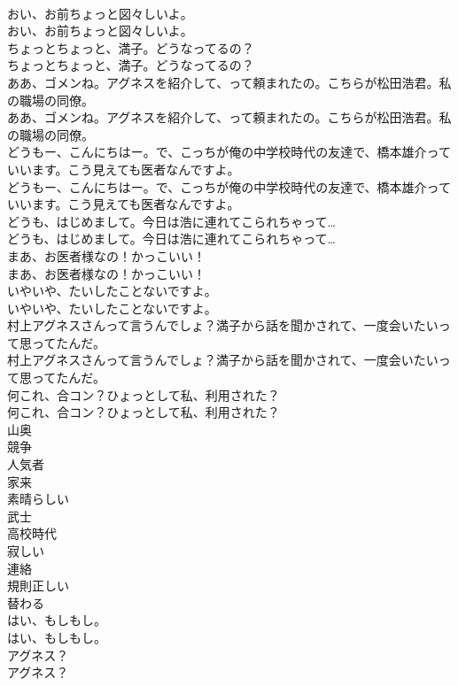 \documentclass[8pt]{extreport}
\begin{document}
\begin{CJK}{UTF8}{min}
\\	おい、お前ちょっと図々しいよ。	
\\	おい、お前ちょっと図々しいよ。 
\\	ちょっとちょっと、満子。どうなってるの？	
\\	ちょっとちょっと、満子。どうなってるの？ 
\\	ああ、ゴメンね。アグネスを紹介して、って頼まれたの。こちらが松田浩君。私の職場の同僚。	
\\	ああ、ゴメンね。アグネスを紹介して、って頼まれたの。こちらが松田浩君。私の職場の同僚。 
\\	どうもー、こんにちはー。で、こっちが俺の中学校時代の友達で、橋本雄介っていいます。こう見えても医者なんですよ。	
\\	どうもー、こんにちはー。で、こっちが俺の中学校時代の友達で、橋本雄介っていいます。こう見えても医者なんですよ。 
\\	どうも、はじめまして。今日は浩に連れてこられちゃって…	
\\	どうも、はじめまして。今日は浩に連れてこられちゃって… 
\\	まあ、お医者様なの！かっこいい！	
\\	まあ、お医者様なの！かっこいい！ 
\\	いやいや、たいしたことないですよ。	
\\	いやいや、たいしたことないですよ。 
\\	村上アグネスさんって言うんでしょ？満子から話を聞かされて、一度会いたいって思ってたんだ。	
\\	村上アグネスさんって言うんでしょ？満子から話を聞かされて、一度会いたいって思ってたんだ。 
\\	何これ、合コン？ひょっとして私、利用された？	
\\	何これ、合コン？ひょっとして私、利用された？ 
\\	山奥
\\	競争
\\	人気者
\\	家来
\\	素晴らしい
\\	武士
\\	高校時代
\\	寂しい
\\	連絡
\\	規則正しい
\\	替わる
\\	はい、もしもし。	
\\	はい、もしもし。 
\\	アグネス？	
\\	アグネス？ 

\end{CJK}
\end{document}
